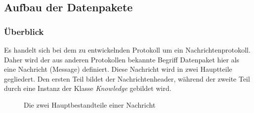 \subsection{Aufbau der Datenpakete}
\subsubsection{Überblick}
Es handelt sich bei dem zu entwickelnden Protokoll um ein Nachrichtenprotokoll. Daher wird der aus anderen Protokollen bekannte Begriff Datenpaket hier als eine Nachricht (Message) definiert. Diese Nachricht wird in zwei Hauptteile gegliedert. Den ersten Teil bildet der Nachrichtenheader, während der zweite Teil durch eine Instanz der Klasse \textit{Knowledge} gebildet wird.\\
\begin{figure}[H]
	\centering
	\caption{Die zwei Hauptbestandteile einer Nachricht}
	\label{fig:message1}
\end{figure}
\newpage
